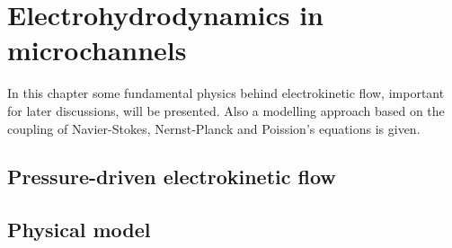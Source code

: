 \chapter{Electrohydrodynamics in microchannels}

In this chapter some fundamental physics behind electrokinetic flow,
important for later discussions, will be presented. Also a
modelling approach based on the coupling of Navier-Stokes,
Nernst-Planck and Poission's equations is given.



\section{Pressure-driven electrokinetic flow}

\section{Physical model}




